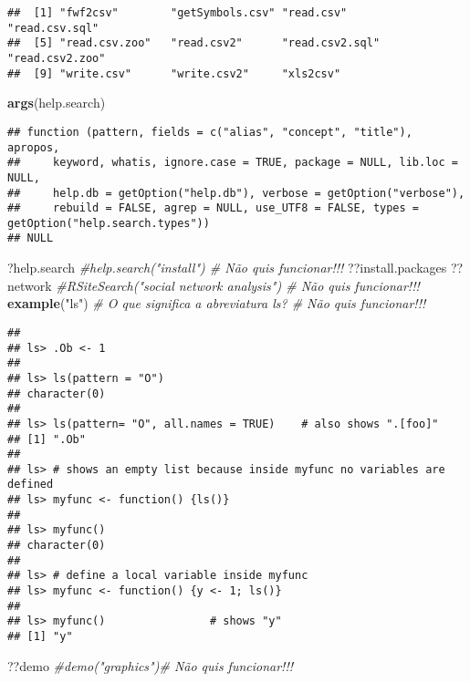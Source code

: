 \documentclass[]{article}
\newenvironment{Shaded}{\begin{snugshade}}{\end{snugshade}}
\newcommand{\KeywordTok}[1]{\textcolor[rgb]{0.13,0.29,0.53}{\textbf{#1}}}
\newcommand{\StringTok}[1]{\textcolor[rgb]{0.31,0.60,0.02}{#1}}
\newcommand{\CommentTok}[1]{\textcolor[rgb]{0.56,0.35,0.01}{\textit{#1}}}
\newcommand{\NormalTok}[1]{#1}
\begin{document}
\begin{verbatim}
##  [1] "fwf2csv"        "getSymbols.csv" "read.csv"       "read.csv.sql"  
##  [5] "read.csv.zoo"   "read.csv2"      "read.csv2.sql"  "read.csv2.zoo" 
##  [9] "write.csv"      "write.csv2"     "xls2csv"
\end{verbatim}

\begin{Shaded}
\begin{Highlighting}[]
\KeywordTok{args}\NormalTok{(help.search)}
\end{Highlighting}
\end{Shaded}

\begin{verbatim}
## function (pattern, fields = c("alias", "concept", "title"), apropos, 
##     keyword, whatis, ignore.case = TRUE, package = NULL, lib.loc = NULL, 
##     help.db = getOption("help.db"), verbose = getOption("verbose"), 
##     rebuild = FALSE, agrep = NULL, use_UTF8 = FALSE, types = getOption("help.search.types")) 
## NULL
\end{verbatim}

\begin{Shaded}
\begin{Highlighting}[]
\NormalTok{?help.search}
\CommentTok{#help.search("install") # Não quis funcionar!!!}
\NormalTok{??install.packages}
\NormalTok{??network}
\CommentTok{#RSiteSearch("social network analysis") # Não quis funcionar!!!}
\KeywordTok{example}\NormalTok{(}\StringTok{"ls"}\NormalTok{) }\CommentTok{# O que significa a abreviatura ls? # Não quis funcionar!!!}
\end{Highlighting}
\end{Shaded}

\begin{verbatim}
## 
## ls> .Ob <- 1
## 
## ls> ls(pattern = "O")
## character(0)
## 
## ls> ls(pattern= "O", all.names = TRUE)    # also shows ".[foo]"
## [1] ".Ob"
## 
## ls> # shows an empty list because inside myfunc no variables are defined
## ls> myfunc <- function() {ls()}
## 
## ls> myfunc()
## character(0)
## 
## ls> # define a local variable inside myfunc
## ls> myfunc <- function() {y <- 1; ls()}
## 
## ls> myfunc()                # shows "y"
## [1] "y"
\end{verbatim}

\begin{Shaded}
\begin{Highlighting}[]
\NormalTok{??demo}
\CommentTok{#demo("graphics")# Não quis funcionar!!!}
\end{Highlighting}
\end{Shaded}
\end{document}
